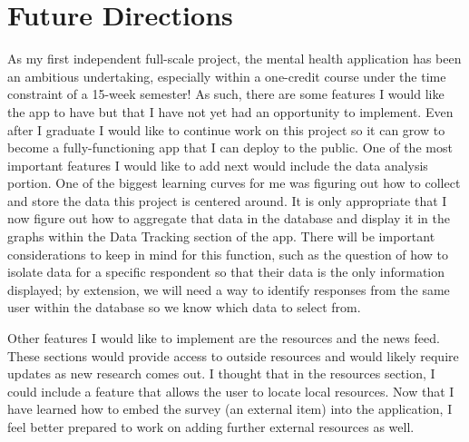 \documentclass{article}
\begin{document}
\section{Future Directions}

As my first independent full-scale project, the mental health application has been an ambitious undertaking, especially within a one-credit course under the time constraint of a 15-week semester! As such, there are some features I would like the app to have but that I have not yet had an opportunity to implement. Even after I graduate I would like to continue work on this project so it can grow to become a fully-functioning app that I can deploy to the public. One of the most important features I would like to add next would include the data analysis portion. One of the biggest learning curves for me was figuring out how to collect and store the data this project is centered around. It is only appropriate that I now figure out how to aggregate that data in the database and display it in the graphs within the Data Tracking section of the app. There will be important considerations to keep in mind for this function, such as the question of how to isolate data for a specific respondent so that their data is the only information displayed; by extension, we will need a way to identify responses from the same user within the database so we know which data to select from.

Other features I would like to implement are the resources and the news feed. These sections would provide access to outside resources and would likely require updates as new research comes out. I thought that in the resources section, I could include a feature that allows the user to locate local resources. Now that I have learned how to embed the survey (an external item) into the application, I feel better prepared to work on adding further external resources as well.
\end{document}
